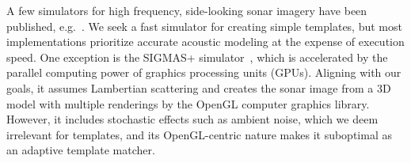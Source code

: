 

%

%
A few simulators for high frequency, side-looking sonar imagery have been published, e.g.~\cite{Bell1997,Sammelm2003}. We seek a fast simulator for creating simple templates, but most implementations prioritize accurate acoustic modeling at the expense of execution speed. One exception is the SIGMAS+ simulator~\cite{Coiras2009a, Coiras2009b}, which is accelerated by the parallel computing power of graphics processing units (GPUs). Aligning with our goals, it assumes Lambertian scattering and creates the sonar image from a 3D model with multiple renderings by the OpenGL computer graphics library. However, it includes stochastic effects such as ambient noise, which we deem irrelevant for templates, and its OpenGL-centric nature makes it suboptimal as an adaptive template matcher.





